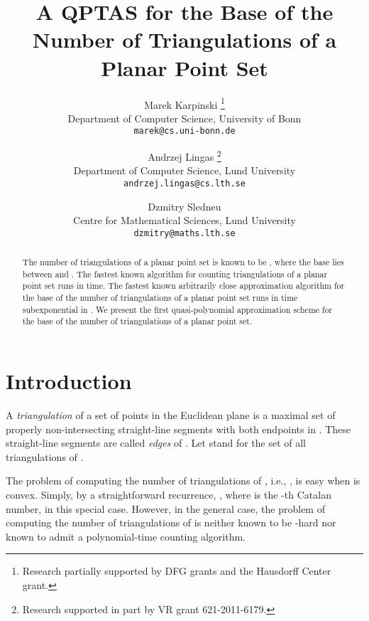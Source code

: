 \documentclass[a4paper]{article}
\begin{document}
\title{A QPTAS for the Base of the Number 
of Triangulations of a Planar Point Set}

\author{
Marek Karpinski
\thanks{Research partially supported by DFG grants and the Hausdorff Center grant.}\\
Department of Computer Science, University of Bonn\\
\texttt{marek@cs.uni-bonn.de}
\and
Andrzej Lingas
\thanks{Research supported in part by VR grant 621-2011-6179.}\\
Department of Computer Science, Lund University\\
\texttt{andrzej.lingas@cs.lth.se}
\and
Dzmitry Sledneu\\
Centre for Mathematical Sciences, Lund University\\
\texttt{dzmitry@maths.lth.se}
}

\maketitle

\begin{abstract}
The number of triangulations of a planar  point
set is known to be , where the base 
lies between  and .
The fastest known algorithm for counting triangulations
of a planar  point set runs in  time. 
The fastest known arbitrarily close approximation
algorithm for the base of the
number of triangulations of a planar  point set
runs in time subexponential in .
We present the first quasi-polynomial
approximation scheme for the base of the number
of triangulations of a planar point set.
\end{abstract}

\section{Introduction}

A \emph{triangulation}   of a set  of  points
in the Euclidean plane is a maximal set of
properly non-intersecting straight-line segments
with both endpoints in . These straight-line segments
are called \emph{edges} of .
Let  stand for the set of all triangulations
of . 

The problem of computing the number of triangulations
of , i.e., , is easy when  is convex.
Simply, by a straightforward recurrence, 
, where  is the -th Catalan
number, in this special case. However, in the general
case, the problem of computing the number
of triangulations of  is neither known to
be -hard nor known to admit a polynomial-time counting algorithm.
\end{document}
